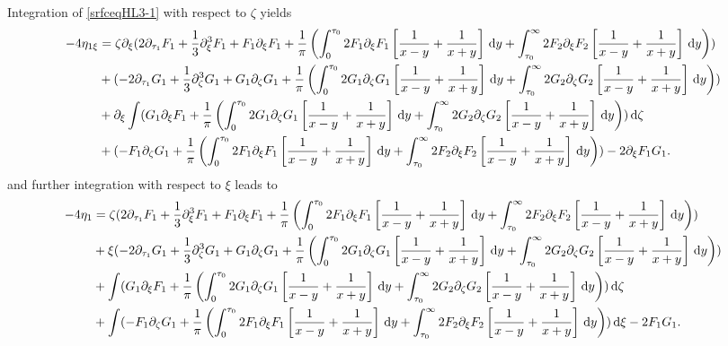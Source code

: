 \documentclass[10pt,reqno,oneside,a4paper, landscape]{article}
\begin{document}
Integration of \eqref{srfceqHL3-1} with respect to $\zeta$ yields
\begin{equation}
\begin{aligned}
- 4\eta_{1\xi} &= \zeta \partial_\xi (2 \partial_{\tau_1}F_1 + \frac{1}{3} \partial_\xi^3 F_1 + F_1\partial_\xi F_1 + \frac{1}{\pi} \left( \int_0^{\tau_0} 2 F_1  \partial_\xi F_1 \left[ \frac{1}{x-y} + \frac{1}{x+y} \right] \,\mathrm{d} y +\int_{\tau_0}^\infty 2 F_2 \partial_\xi F_2\left[ \frac{1}{x-y} + \frac{1}{x+y} \right] \,\mathrm{d} y \right))  \\
&+(- 2 \partial_{\tau_1} G_1 +  \frac{1}{3} \partial_\zeta^3 G_1+ G_1 \partial_{\zeta} G_1  + \frac{1}{\pi} \left( \int_0^{\tau_0}  2 G_1 \partial_\zeta G_1 \left[ \frac{1}{x-y} + \frac{1}{x+y} \right] \,\mathrm{d} y +\int_{\tau_0}^\infty 2 G_2 \partial_\zeta G_2 \left[ \frac{1}{x-y} + \frac{1}{x+y} \right] \,\mathrm{d} y \right)) \\
&+ \partial_{\xi}\int (G_1 \partial_\xi F_1 + \frac{1}{\pi} \left( \int_0^{\tau_0} 2 G_1 \partial_\zeta G_1 \left[ \frac{1}{x-y} + \frac{1}{x+y} \right] \,\mathrm{d} y +\int_{\tau_0}^\infty 2 G_2 \partial_\zeta G_2 \left[ \frac{1}{x-y} + \frac{1}{x+y} \right] \,\mathrm{d} y \right) )\,\mathrm{d} \zeta \\
&+(-F_1\partial_\zeta G_1 + \frac{1}{\pi} \left( \int_0^{\tau_0} 2 F_1  \partial_\xi F_1 \left[ \frac{1}{x-y} + \frac{1}{x+y} \right] \,\mathrm{d} y +\int_{\tau_0}^\infty 2 F_2 \partial_\xi F_2  \left[ \frac{1}{x-y} + \frac{1}{x+y} \right] \,\mathrm{d} y \right)) - 2 \partial_\xi F_1 G_1. 
\end{aligned}
\end{equation}
and further integration with respect to $\xi$ leads to
\begin{align*}
- 4\eta_{1} &= \zeta (2 \partial_{\tau_1}F_1 + \frac{1}{3} \partial_\xi^3 F_1 + F_1\partial_\xi F_1 + \frac{1}{\pi} \left( \int_0^{\tau_0} 2 F_1  \partial_\xi F_1 \left[ \frac{1}{x-y} + \frac{1}{x+y} \right] \,\mathrm{d} y +\int_{\tau_0}^\infty 2 F_2 \partial_\xi F_2\left[ \frac{1}{x-y} + \frac{1}{x+y} \right] \,\mathrm{d} y \right) ) \\
&+\xi (- 2 \partial_{\tau_1} G_1 +  \frac{1}{3} \partial_\zeta^3 G_1+ G_1 \partial_{\zeta} G_1  + \frac{1}{\pi} \left( \int_0^{\tau_0}  2 G_1 \partial_\zeta G_1 \left[ \frac{1}{x-y} + \frac{1}{x+y} \right] \,\mathrm{d} y +\int_{\tau_0}^\infty 2 G_2 \partial_\zeta G_2 \left[ \frac{1}{x-y} + \frac{1}{x+y} \right] \,\mathrm{d} y \right) )\\
&+ \int (G_1 \partial_\xi F_1 + \frac{1}{\pi} \left( \int_0^{\tau_0} 2 G_1 \partial_\zeta G_1 \left[ \frac{1}{x-y} + \frac{1}{x+y} \right] \,\mathrm{d} y +\int_{\tau_0}^\infty 2 G_2 \partial_\zeta G_2 \left[ \frac{1}{x-y} + \frac{1}{x+y} \right] \,\mathrm{d} y \right) )\,\mathrm{d} \zeta \\
&+\int (-F_1\partial_\zeta G_1 + \frac{1}{\pi} \left( \int_0^{\tau_0} 2 F_1  \partial_\xi F_1 \left[ \frac{1}{x-y} + \frac{1}{x+y} \right] \,\mathrm{d} y +\int_{\tau_0}^\infty 2 F_2 \partial_\xi F_2  \left[ \frac{1}{x-y} + \frac{1}{x+y} \right] \,\mathrm{d} y \right))\,\mathrm{d} \xi - 2 F_1 G_1. 
\end{align*}
\end{document}

